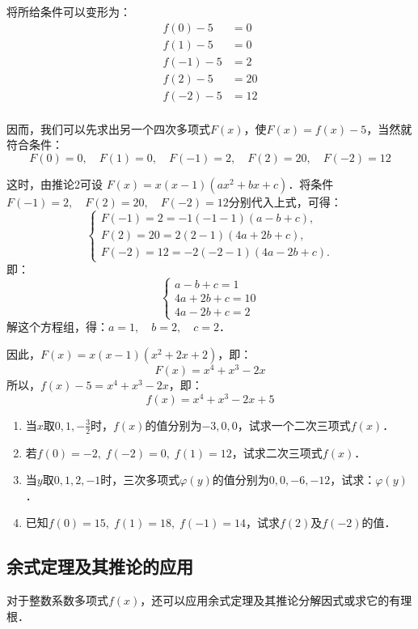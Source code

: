 \begin{solution}
    将所给条件可以变形为：  
\[\begin{split}
    f(0)-5&=0\\
    f(1)-5&=0\\
    f(-1)-5&=2\\
    f(2)-5&=20\\
    f(-2)-5&=12\\
\end{split}\]

因而，我们可以先求出另一个四次多项式$F(x)$，使$F(x)=f(x)-5$，当然就符合条件：
\[F(0)=0,\quad F (1) =0,\quad  F (-1) =2,\quad F (2) =20,\quad  F (-2) =12\]

这时，由推论2可设
$F (x) =x (x-1) (ax^2+bx+c)$．将条件$F(-1)=2,\quad F(2)=20,\quad F(-2)=12$分别代入上式，可得：
\[\begin{cases}
    F (-1) =2=-1 (-1-1) (a-b+c),\\
    F (2) =20=2 (2-1) (4a+2b+c),\\
    F (-2) =12=-2 (-2-1) (4a-2b+c). 
\end{cases}\]
即：\[\begin{cases}
    a-b+c=1\\
4a+2b+c=10\\
4a-2b+c=2
\end{cases}\]
解这个方程组，得：$a=1,\quad b=2,\quad c=2$．

因此，$F(x)=x(x-1)(x^2+2x+2)$，即：
\[F(x)=x^4+x^3-2x\]
所以，$f(x)-5=x^4+x^3-2x$，即：
\[f(x)=x^4+x^3-2x+5\]
\end{solution}

\begin{ex}
\begin{enumerate}
    \item 当$x$取$0,1,-\frac{3}{2}$时，$f(x)$的值分别为$-3,0,0$，试求一个二次三项式$f(x)$．
\item 若$f(0)=-2,\; f(-2)=0,\; f(1)=12$，试求二次三项式$f(x)$．
\item 当$y$取$0, 1, 2,-1$时，三次多项式$\varphi(y)$的值分别为$0, 0,-6,-12$，试求：$\varphi(y)$．
\item 已知$f(0)=15,\; f(1)=18,\; f(-1)=14$，试求$f(2)$及$f(-2)$的值．
\end{enumerate}
\end{ex}

\subsection{余式定理及其推论的应用}
对于整数系数多项式$f(x)$，还可以应用余式定理及其推论分解因式或求它的有理根．

